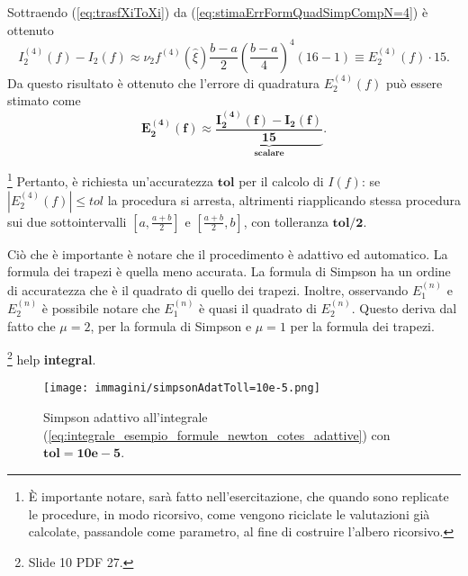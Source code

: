 Sottraendo (\ref{eq:trasfXiToXi}) da (\ref{eq:stimaErrFormQuadSimpCompN=4}) è ottenuto
\begin{equation*}
    I_2^{(4)}(f)-I_2(f)\approx\nu_2 f^{(4)}(\widehat\xi)\frac{b-a}{2}\left(\frac{b-a}{4}\right)^4(16-1)\equiv E_2^{(4)}(f)\cdot 15.
\end{equation*}
Da questo risultato è ottenuto che l'errore di quadratura $E_2^{(4)}(f)$ può essere stimato come
\begin{equation}
    \boldsymbol{E_2^{(4)}(f)\approx\underbrace{\frac{I_2^{(4)}(f)-I_2(f)}{15}}_{\text{scalare}}}.
\end{equation}

\footnote{È importante notare, sarà fatto nell'esercitazione, che quando sono replicate le procedure, in modo ricorsivo, come vengono riciclate le valutazioni già calcolate, passandole come parametro, al fine di costruire l'albero ricorsivo.}
Pertanto, è richiesta un'accuratezza $\boldsymbol{tol}$ per il calcolo di $I(f)$: se $\left|E_2^{(4)}(f)\right|\leq tol$ la procedura si arresta, altrimenti riapplicando stessa procedura sui due sottointervalli $\left[a,\frac{a+b}{2}\right]$ e $\left[\frac{a+b}{2},b\right]$, con tolleranza $\boldsymbol{tol/2}$.

Ciò che è importante è notare che il procedimento è adattivo ed automatico. La formula dei trapezi è quella meno accurata. La formula di Simpson ha un ordine di accuratezza che è il quadrato di quello dei trapezi.
Inoltre, osservando $E_1^{(n)}$ e $E_2^{(n)}$ è possibile notare che $E_1^{(n)}$ è quasi il quadrato di $E_2^{(n)}$. Questo deriva dal fatto che $\mu=2$, per la formula di Simpson e $\mu=1$ per la formula dei trapezi.

\begin{remark}
    \footnote{Slide 10 PDF 27.} help \textbf{integral}.
\end{remark}

\begin{figure}
    \centering
    \texttt{[image: immagini/simpsonAdatToll=10e-5.png]}
    \caption{Simpson adattivo all'integrale (\ref{eq:integrale_esempio_formule_newton_cotes_adattive}) con $\boldsymbol{tol=10e-5}$.}\label{fig:simpsonAdatToll=10e-5}
\end{figure}
